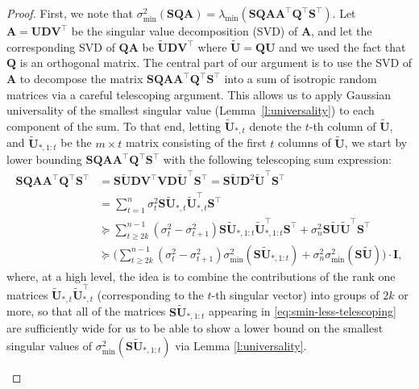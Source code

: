 \documentclass[11pt]{article}
\let\origtop\top
\renewcommand\top{{\scriptscriptstyle{\origtop}}}
\def\A{{\mathbf A}}
\def\I{{\mathbf I}}
\def\Q{{\mathbf Q}}
\def\S{{\mathbf S}}
\def\D{{\mathbf D}}
\def\V{{\mathbf V}}
\def\U{{\mathbf U}}
\begin{document}
\begin{proof}
First, we note that $\sigma_{\min}^2(\S\Q\A)=\lambda_{\min}(\S\Q\A\A^\top\Q^\top\S^\top)$. Let $\A=\U\D\V^\top$ be the singular value decomposition (SVD) of $\A$, and let the corresponding SVD of $\Q\A$ be $\tilde\U\D\V^\top$ where $\tilde\U=\Q\U$ and we used the fact that $\Q$ is an orthogonal matrix. The central part of our argument is to use the SVD of $\A$ to decompose the matrix $\S\Q\A\A^\top\Q^\top\S^\top$ into a sum of isotropic random matrices via a careful telescoping argument. This allows us to apply Gaussian universality of the smallest singular value (Lemma~\ref{l:universality}) to each component of the sum. To that end, letting $\tilde\U_{*,t}$ denote the $t$-th column of $\tilde\U$, and $\tilde\U_{*,1:t}$ be the $m\times t$ matrix consisting of the first $t$ columns of $\tilde\U$, we start by lower bounding $\S\Q\A\A^\top\Q^\top\S^\top$ with the following telescoping sum expression:
  \begin{align}
    \S\Q\A\A^\top\Q^\top\S^\top
    &= \S\tilde\U\D\V^\top\V\D\tilde\U^\top\S^\top=\S\tilde\U\D^2\tilde\U^\top\S^\top\nonumber
    \\    &=\sum_{t=1}^n\sigma_t^2\S\tilde\U_{*,t}\tilde\U_{*,t}^\top\S^\top\nonumber
    \\
    &\succeq \sum_{t\geq
      2k}^{n-1}(\sigma_t^2-\sigma_{t+1}^2)\S\tilde\U_{*,1:t}\tilde\U_{*,1:t}^\top\S^\top 
      + \sigma_n^2 \S \tilde\U\tilde\U^\top \S^\top\nonumber
    \\
    &\succeq
      \Big( \sum_{t\geq
      2k}^{n-1}(\sigma_t^2-\sigma_{t+1}^2)\sigma_{\min}^2(\S\tilde\U_{*,1:t})
      + \sigma_n^2 \sigma_{\min}^2(\S\tilde\U)\Big) \cdot\I,\label{eq:smin-less-telescoping}
  \end{align}
where, at a high level, the idea is to combine the contributions of the rank one matrices $\tilde\U_{*,t}\tilde\U_{*,t}^\top$ (corresponding to the $t$-th singular vector) into groups of $2k$ or more, so that all of the matrices $\S\tilde\U_{*,1:t}$ appearing in \eqref{eq:smin-less-telescoping} are sufficiently wide for us to be able to show a lower bound on the smallest singular values of $\sigma_{\min}^2(\S\tilde\U_{*,1:t})$ via Lemma \ref{l:universality}.

\begin{figure}
\end{figure}
\end{proof}
\end{document}
